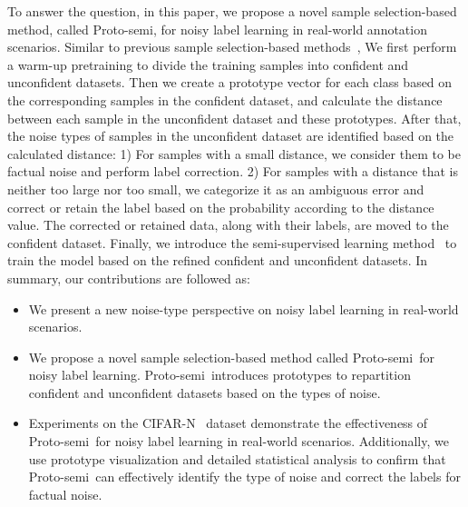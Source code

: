 \documentclass[letterpaper]{article} %
\newcommand{\method}{Proto-semi}
\begin{document}
To answer the question,
in this paper, 
we propose a novel sample selection-based method,
called \method,
for noisy label learning in real-world annotation scenarios.
Similar to previous sample selection-based methods~\cite{DBLP:journals/corr/abs-2303-10802, DBLP:journals/corr/abs-2007-08199, DBLP:conf/iclr/WeiZ0L0022}, 
We first perform a warm-up pretraining to divide the training samples into confident and unconfident datasets.
Then we create a prototype vector for each class based on the corresponding samples in the confident dataset, 
and calculate the distance between each sample in the unconfident dataset and these prototypes. 
After that, the noise types of samples in the unconfident dataset are identified based on the calculated distance:
1) For samples with a small distance, we consider them to be factual noise and perform label correction.
2) For samples with a distance that is neither too large nor too small, 
we categorize it as an ambiguous error and correct or retain the label based on the probability according to the distance value. 
The corrected or retained data, along with their labels, are moved to the confident dataset.
Finally, we introduce the semi-supervised learning method~\cite{DBLP:conf/nips/BerthelotCGPOR19} to train the model based on the refined confident and unconfident datasets. In summary, our contributions are followed as:
\begin{itemize}
    \item We present a new noise-type perspective on noisy label learning in real-world scenarios.
    \item We propose a novel sample selection-based method called \method\ for noisy label learning. \method\ introduces prototypes to repartition confident and unconfident datasets based on the types of noise.
    \item Experiments on the CIFAR-N~\cite{DBLP:conf/iclr/WeiZ0L0022} dataset demonstrate the effectiveness of \method\ for noisy label learning in real-world scenarios. Additionally, we use prototype visualization and detailed statistical analysis to confirm that \method\ can effectively identify the type of noise and correct the labels for factual noise.
\end{itemize}
\end{document}
